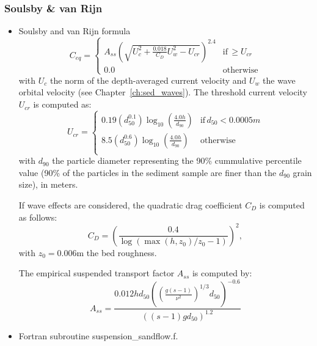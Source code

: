 \subsubsection{Soulsby \& van Rijn}
\begin{itemize}
\item Soulsby and van Rijn formula~\cite{Soulsby97} 
  \begin{equation*}
C_{eq}=\left\{\begin{array}{ll}
A_{ss}\left(\sqrt{U_c^2+\frac{0.018}{C_D}U_w^2-U_{cr}}\right)^{2.4} & \text{if}\, \geq U_{cr}\\
0.0 &  \text{otherwise}
\end{array}
\right.    
\end{equation*}
  with $U_c$ the norm of the depth-averaged current velocity and $U_w$ the wave orbital velocity (see Chapter~\ref{ch:sed_waves}). The threshold current velocity $U_{cr}$ is computed as:
\begin{equation*}
U_{cr}=\left\{\begin{array}{ll}  
  0.19 (d_{50}^{0.1})\log_{10}\left(\frac{4.0 h}{d_{90}}\right) & \text{if}\, d_{50} < 0.0005 m\\
  8.5 (d_{50}^{0.6})\log_{10}\left(\frac{4.0 h}{d_{90}}\right) & \text{otherwise}\\
\end{array}
\right.    
\end{equation*}
with $d_{90}$ the particle diameter representing the 90\% cummulative percentile value (90\% of the particles in the sediment sample are finer than the $d_{90}$ grain size), in meters. 

If wave effects are considered, the quadratic drag coefficient $C_D$ is computed as follows:
\begin{equation*}
  C_D = \left(\frac{0.4}{\log(\max(h, z_{0})/z_{0}-1)}\right)^{2},
\end{equation*}
with $z_{0}=0.006$m the bed roughness.

The empirical suspended transport factor $A_{ss}$ is computed by:
\begin{equation*}
A_{ss} = \frac{0.012 h d_{50} \left(\left(\frac{g(s-1)}{\nu^2}\right)^{1/3}d_{50}\right)^{-0.6}}{\left((s-1)g d_{50}\right)^{1.2}}
\end{equation*}
\item Fortran subroutine {\ttfamily suspension\_sandflow.f}.
\end{itemize}


